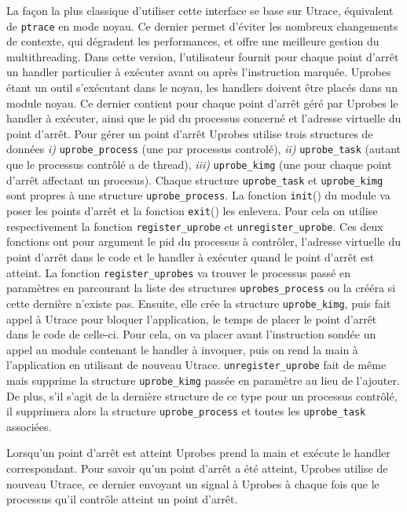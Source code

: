 La façon la plus classique d'utiliser cette interface se base sur Utrace,
équivalent de \texttt{ptrace} en mode noyau. Ce dernier permet d'éviter les
nombreux changements de contexte, qui dégradent les performances, et offre une
meilleure gestion du multithreading. Dans cette version, l'utilisateur fournit
pour chaque point d'arrêt un handler particulier à exécuter avant ou après
l’instruction marquée. Uprobes étant un outil s'exécutant dans le noyau, les
handlers doivent être placés dans un module noyau. Ce dernier contient pour
chaque point d'arrêt géré par Uprobes le handler à exécuter, ainsi que le pid du
processus concerné et l'adresse virtuelle du point d'arrêt. Pour gérer un point
d'arrêt Uprobes utilise trois structures de
données \textit{i)} \texttt{uprobe\_process} (une par processus controlé),
\textit{ii)} \texttt{uprobe\_task} (autant que le processus contrôlé a de
thread), \textit{iii)} \texttt{uprobe\_kimg} (une pour chaque point d'arrêt
affectant un procesus). Chaque structure \texttt{uprobe\_task} et
\texttt{uprobe\_kimg} sont propres à une structure \texttt{uprobe\_process}. La
fonction \texttt{init}() du module va poser les points d'arrêt et la fonction
\texttt{exit}() les enlevera. Pour cela on utilise respectivement la fonction
\texttt{register\_uprobe} et \texttt{unregister\_uprobe}. Ces deux fonctions ont
pour argument le pid du processus à contrôler, l'adresse virtuelle du point
d'arrêt dans le code et le handler à exécuter quand le point d'arrêt est
atteint. La fonction \texttt{register\_uprobes} va trouver le processus passé en
paramètres en parcourant la liste des structures \texttt{uprobes\_process} ou la
crééra si cette dernière n'existe pas. Ensuite, elle crée la structure
\texttt{uprobe\_kimg}, puis fait appel à Utrace pour bloquer l'application, le
temps de placer le point d'arrêt dans le code de celle-ci. Pour cela, on va
placer avant l'instruction sondée un appel au module contenant le handler à
invoquer, puis on rend la main à l'application en utilisant de nouveau
Utrace. \texttt{unregister\_uprobe} fait de même mais supprime la structure
\texttt{uprobe\_kimg} passée en paramètre au lieu de l'ajouter. De plus, s'il
s'agit de la dernière structure de ce type pour un processus contrôlé, il
supprimera alors la structure \texttt{uprobe\_process} et toutes les
\texttt{uprobe\_task} associées.

Lorsqu'un point d'arrêt est atteint Uprobes prend la main et exécute le handler
correspondant. Pour savoir qu'un point d'arrêt a été atteint, Uprobes utilise de
nouveau Utrace, ce dernier envoyant un signal à Uprobes à chaque fois que le
processus qu'il contrôle atteint un point d'arrêt.

